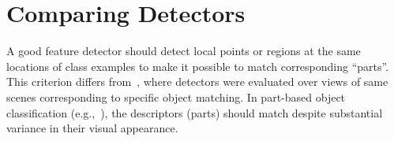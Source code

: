 \documentclass[review]{elsarticle}
\begin{document}
\section{Comparing Detectors\label{sec:detectorcomparison}}
%
A good feature detector should detect local points or regions at the same
locations of class examples to make it possible to match corresponding ``parts''.
This criterion differs from~\cite{MikTuySch:2005}, where detectors were evaluated 
over views of same scenes corresponding to
specific object matching. In part-based object classification (e.g.,~\cite{FelGirMca:2010}),
the descriptors (parts) should match despite substantial variance in their visual
appearance.

%
\end{document}
